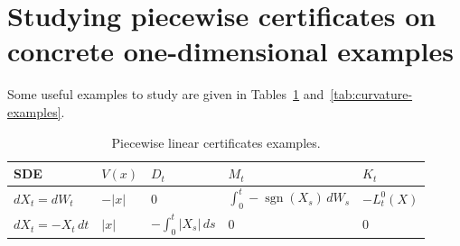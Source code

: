 \section{Studying piecewise certificates on concrete one-dimensional examples}

Some useful examples to study are given in Tables~\ref{tab:kink-examples}
and~\ref{tab:curvature-examples}.

\begin{table}[t]
\centering
\caption{Piecewise linear certificates examples.}
\label{tab:kink-examples}
\begin{tabular}{lllll}
\hline
SDE & $V(x)$ & $D_t$ & $M_t$ & $K_t$ \\
\hline
$dX_t=dW_t$
&
$-|x|$
&
$0$
&
$\displaystyle \int_0^t -\operatorname{sgn}(X_s)\,dW_s$
&
$\displaystyle -L_t^0(X)$
\\[1.1em]


$dX_t=-X_t\,dt$
&
$|x|$
&
$\displaystyle -\int_0^t |X_s|\,ds$
&
$0$
&
$0$
\\
\hline
\end{tabular}
\end{table}

\begin{table}[t]
\centering
\caption{Piecewise $\mathcal{C}^2$ certificates examples.}
\label{tab:curvature-examples}
\end{table}

